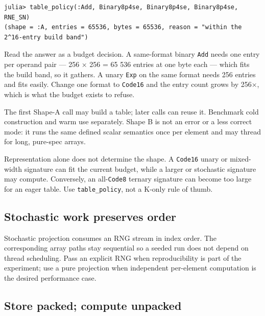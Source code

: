 \nopagebreak[4]
\begin{verbatim}
julia> table_policy(:Add, Binary8p4se, Binary8p4se, Binary8p4se, RNE_SN)
(shape = :A, entries = 65536, bytes = 65536, reason = "within the 2^16-entry build band")
\end{verbatim}



Read the answer as a budget decision. A same-format binary \texttt{Add} needs one entry per operand pair — 256 × 256 = 65 536 entries at one byte each — which fits the build band, so it gathers. A unary \texttt{Exp} on the same format needs 256 entries and fits easily. Change one format to \texttt{Code16} and the entry count grows by 256×, which is what the budget exists to refuse.



The first Shape-A call may build a table; later calls can reuse it. Benchmark cold construction and warm use separately. Shape B is not an error or a less correct mode: it runs the same defined scalar semantics once per element and may thread for long, pure-spec arrays.



Representation alone does not determine the shape. A \texttt{Code16} unary or mixed-width signature can fit the current budget, while a larger or stochastic signature may compute. Conversely, an all-\texttt{Code8} ternary signature can become too large for an eager table. Use \texttt{table\_\allowbreak{}policy}, not a K-only rule of thumb.



\subsection{Stochastic work preserves order}



\label{4277523130793394082}{}


Stochastic projection consumes an RNG stream in index order. The corresponding array paths stay sequential so a seeded run does not depend on thread scheduling. Pass an explicit RNG when reproducibility is part of the experiment; use a pure projection when independent per-element computation is the desired performance case.



\subsection{Store packed; compute unpacked}



